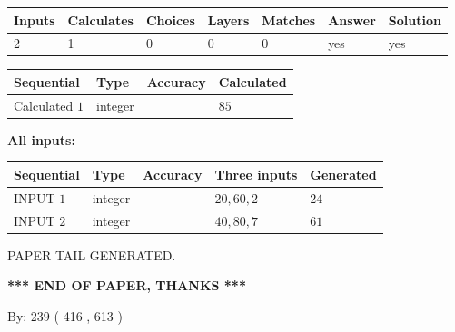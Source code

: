 \documentclass{ctexart}
\begin{document}
   
\noindent\begin{tabular}{|l|l|l|l|l|l|l|}
 \hline
Inputs & Calculates & Choices & Layers & Matches & Answer & Solution \\ \hline
 2  & 
 1  & 
 0
  & 
 0  & 
 0  & 
  yes & 
  yes 
  \\ \hline
 \end{tabular}
   
   
   
   
\noindent{}
   
   
  
  
\noindent\begin{tabular}{|l|l|l|l|}
\hline
 Sequential & Type & Accuracy & Calculated \\ 
\hline
 
 
  Calculated $  1 $ & integer &  & 
  $ 85 $ 
 \\  \hline  
 \end{tabular}
   
   
   
   
\noindent\vspace{0.1in}\hspace{-0.08in} {\textbf{\Large{All inputs: }}}
   
   
  
  
\noindent\begin{tabular}{|l|l|l|l|l|}
\hline
 Sequential & Type & Accuracy & Three inputs & Generated \\ 
\hline
 
 
  INPUT $  1 $ & integer &  & $
 20
 , 
 60
 , 
 2
 $ & $ 24 $ 
 \\  \hline  
 
 
  INPUT $  2 $ & integer &  & $
 40
 , 
 80
 , 
 7
 $ & $ 61 $ 
 \\  \hline  
 \end{tabular}
   
   
   
   
   
   
 \vspace{0.2in}
 
   
   
\vspace{2.0in} PAPER TAIL GENERATED.
   
   
   
   
\vspace{1.0in} 
{\textbf{\large{ *** END OF PAPER, THANKS *** }}} 
   
   
\hspace{1.0in} By: 
 239 ( 416 ,  613 )
   
\end{document}
